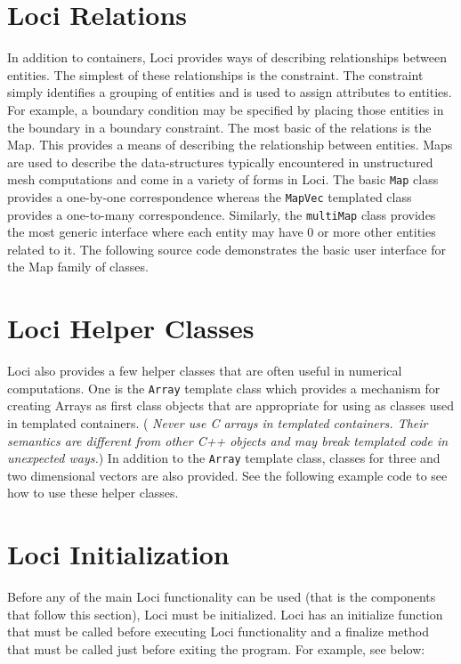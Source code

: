 \documentclass[10pt,epsf]{book}
\begin{document}
\section{Loci Relations}
In addition to containers, Loci provides ways of describing
relationships between entities.  The simplest of these relationships
is the constraint.  The constraint simply identifies a grouping of
entities and is used to assign attributes to entities.  For example,
a boundary condition may be specified by placing those entities in the
boundary in a boundary constraint.  The most basic of the relations is
the Map.  This provides a means of describing the relationship between
entities.  Maps are used to describe the data-structures typically
encountered in unstructured mesh computations and come in a variety of
forms in Loci.  The basic {\tt Map} class provides a one-by-one
correspondence whereas the {\tt MapVec} templated class provides a
one-to-many correspondence.  Similarly, the {\tt multiMap} class
provides the most generic interface where each entity may have 0 or
more other entities related to it.  The following source code
demonstrates the basic user interface for the Map family of classes.




\section{Loci Helper Classes}

Loci also provides a few helper classes that are often useful in
numerical computations.  One is the {\tt Array} template class which provides a
mechanism for creating Arrays as first class objects that are
appropriate for using as classes used in templated containers. ({\it
Never use C arrays in templated containers.  Their semantics are
different from other C++ objects and may break templated code in
unexpected ways.})  In addition to the {\tt Array} template class,
classes for three and two dimensional vectors are also provided.  See
the following example code to see how to use these helper classes.



\section{Loci Initialization}

Before any of the main Loci functionality can be used (that is the
components that follow this section), Loci must be initialized.  Loci
has an initialize function that must be called before executing Loci
functionality and a finalize method that must be called just before
exiting the program.  For example, see below:
\end{document}
